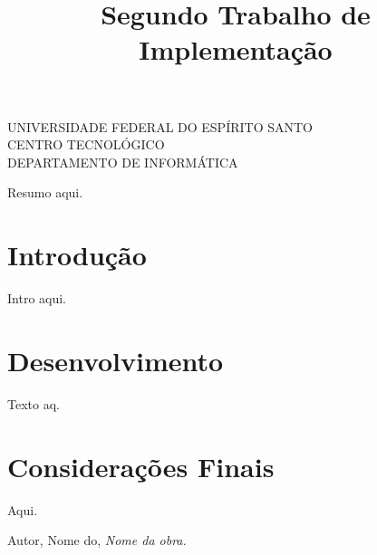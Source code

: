 \documentclass[oneside]{abntex2}
\title{Segundo Trabalho de Implementação}
\renewcommand{\imprimircapa}{
	\begin{capa}
		\center

		\ABNTEXchapterfont\large UNIVERSIDADE FEDERAL DO ESPÍRITO SANTO \\ CENTRO TECNOLÓGICO \\ DEPARTAMENTO DE INFORMÁTICA

		\vfill
		\begin{center}
		\ABNTEXchapterfont\bfseries\LARGE\imprimirtitulo
		\end{center}
		\vfill

		\ABNTEXchapterfont\large\imprimirautor
		\vfill

		\large\imprimirlocal

		\large\imprimirdata

		\vspace*{1cm}
	\end{capa}
}
\begin{document}
	\imprimircapa
	\imprimirfolhaderosto

	\begin{resumo}
	Resumo aqui.
	\end{resumo}

	\tableofcontents
	\newpage

	\textual

	\chapter*{Introdução}

	Intro aqui.


	\chapter{Desenvolvimento}

	Texto aq.


	\chapter{Considerações Finais}

	Aqui.


	\begin{thebibliography}{5}
	 Autor, Nome do, \textit{Nome da obra.}
	\end{thebibliography}
\end{document}
